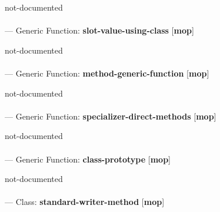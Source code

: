 \begin{adjustwidth}{5em}{5em}
not-documented
\end{adjustwidth}

\paragraph{}
\label{MOP:SLOT-VALUE-USING-CLASS}
--- Generic Function: \textbf{slot-value-using-class} [\textbf{mop}] \textit{}

\begin{adjustwidth}{5em}{5em}
not-documented
\end{adjustwidth}

\paragraph{}
\label{MOP:METHOD-GENERIC-FUNCTION}
--- Generic Function: \textbf{method-generic-function} [\textbf{mop}] \textit{}

\begin{adjustwidth}{5em}{5em}
not-documented
\end{adjustwidth}

\paragraph{}
\label{MOP:SPECIALIZER-DIRECT-METHODS}
--- Generic Function: \textbf{specializer-direct-methods} [\textbf{mop}] \textit{}

\begin{adjustwidth}{5em}{5em}
not-documented
\end{adjustwidth}

\paragraph{}
\label{MOP:CLASS-PROTOTYPE}
--- Generic Function: \textbf{class-prototype} [\textbf{mop}] \textit{}

\begin{adjustwidth}{5em}{5em}
not-documented
\end{adjustwidth}

\paragraph{}
\label{MOP:STANDARD-WRITER-METHOD}
--- Class: \textbf{standard-writer-method} [\textbf{mop}] \textit{}

